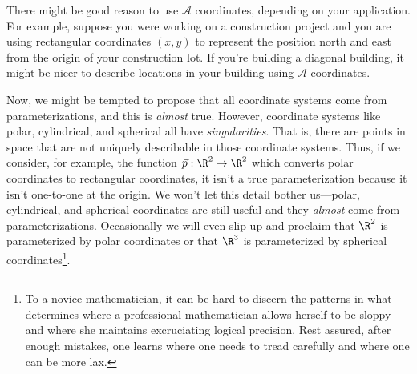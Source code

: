 There might be good reason to use $\mathcal A$ coordinates, depending on your application.
For example, suppose you were working on a construction project and you are using rectangular
coordinates $(x,y)$ to represent the position north and east from the origin of your construction
lot.  If you're building a diagonal building, it might be nicer to describe locations in your building
using $\mathcal A$ coordinates.

\bigskip

Now, we might be tempted to propose that all coordinate systems come from parameterizations,
and this is \emph{almost} true.  However, coordinate systems like polar, cylindrical, and spherical
all have \emph{singularities}.  That is, there are points in space that are not uniquely
describable in those coordinate systems.  Thus, if we consider, for example, the function
$\vec p:\R^2\to\R^2$ which converts polar coordinates to rectangular coordinates, it isn't a true
parameterization because it isn't one-to-one at the origin.  We won't let this detail bother us---polar,
cylindrical, and spherical coordinates are still useful and they \emph{almost} come from parameterizations.
Occasionally we will even slip up and proclaim that $\R^2$ is parameterized by polar coordinates
or that $\R^3$ is parameterized by spherical coordinates\footnote{
	To a novice mathematician, it can be hard to discern the 
	patterns in what determines where a professional mathematician allows
	herself to be sloppy and where she maintains excruciating logical precision.
	Rest assured, after enough mistakes, one learns where one needs to tread carefully
	and where one can be more lax.
}.

\begin{exercises}
\end{exercises}
